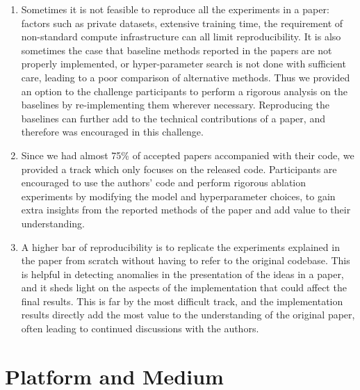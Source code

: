 \begin{enumerate}
    \item {} Sometimes it is not feasible to reproduce all the experiments in a paper: factors such as private datasets, extensive training time, the requirement of non-standard compute infrastructure can all limit reproducibility. It is also sometimes the case that baseline methods reported in the papers are not properly implemented, or hyper-parameter search is not done with sufficient care, leading to a poor comparison of alternative methods. Thus we provided an option to the challenge participants to perform a rigorous analysis on the baselines by re-implementing them wherever necessary. Reproducing the baselines can further add to the technical contributions of a paper, and therefore was encouraged in this challenge.
    
    \item {} Since we had almost 75\% of accepted papers accompanied with their code, we provided a track which only focuses on the released code. Participants are encouraged to use the authors’ code and perform rigorous ablation experiments by modifying the model and hyperparameter choices, to gain extra insights from the reported methods of the paper and add value to their understanding. 
    
    \item {} A higher bar of reproducibility is to replicate the experiments explained in the paper from scratch without having to refer to the original codebase. This is helpful in detecting anomalies in the presentation of the ideas in a paper, and it sheds light on the aspects of the implementation that could affect the final results. This is far by the most difficult track, and the implementation results directly add the most value to the understanding of the original paper, often leading to continued discussions with the authors. 
    
\end{enumerate}


\section{Platform and Medium} 

